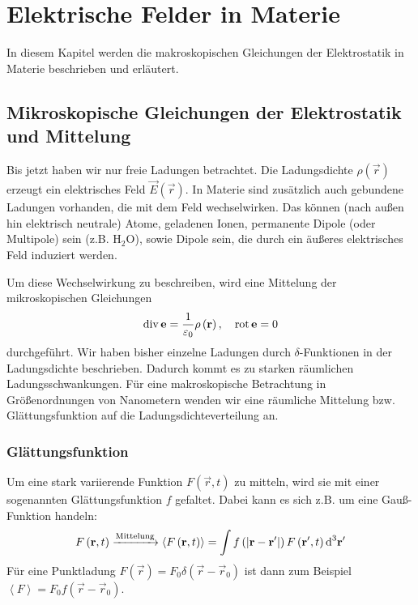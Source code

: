 

\chapter{Elektrische Felder in Materie}

In diesem Kapitel werden die makroskopischen Gleichungen der Elektrostatik in Materie beschrieben und erläutert.

\section{Mikroskopische Gleichungen der Elektrostatik und Mittelung\label{sec:mikroskopische_gleichungen_der_elektrostatik}}

Bis jetzt haben wir nur freie Ladungen betrachtet. Die Ladungsdichte $\rho \left(\vec {r}\right)$ erzeugt ein elektrisches Feld $\vec {E}(\vec r)$. In Materie sind zusätzlich auch gebundene Ladungen vorhanden, die mit dem Feld wechselwirken. Das können (nach außen hin elektrisch neutrale) Atome, geladenen Ionen, permanente Dipole (oder Multipole) sein (z.B. $\mathrm{H}_{2}\mathrm{O}$), sowie Dipole sein, die durch ein äußeres elektrisches Feld induziert werden.

Um diese Wechselwirkung zu beschreiben, wird eine Mittelung der mikroskopischen Gleichungen
\begin{equation*}
	\operatorname{div} \mathbf{e}=\frac{1}{\varepsilon _{0}}\rho \left(\mathbf{r}\right),\quad \operatorname{rot} \mathbf{e}=0
\end{equation*}
durchgeführt. Wir haben bisher einzelne Ladungen durch $\delta $-Funktionen in der Ladungsdichte beschrieben. Dadurch kommt es zu starken räumlichen Ladungsschwankungen. Für eine makroskopische Betrachtung in Größenordnungen von Nanometern wenden wir eine räumliche Mittelung bzw. Glättungsfunktion auf die Ladungsdichteverteilung an.


\subsection{Glättungsfunktion}

Um eine stark variierende Funktion $F\left(\vec {r},t\right)$ zu mitteln, wird sie mit einer sogenannten Glättungsfunktion $f$ gefaltet. Dabei kann es sich z.B. um eine Gauß-Funktion handeln:
\begin{equation*}
	F\left(\mathbf{r},t\right) \xrightarrow{\text{Mittelung}} \left\langle F\left(\mathbf{r},t\right)\right\rangle =\int f\left(\left| \mathbf{r}-\mathbf{r}'\right| \right)F\left(\mathbf{r}',t\right)\text{d} ^{3}\mathbf{r}'
\end{equation*}
Für eine Punktladung $F\left(\vec {r}\right)=F_{0}\delta \left(\vec {r}-\vec {r}_{0}\right)$ ist dann zum Beispiel $\left\langle F\right\rangle =F_{0}f\left(\vec {r}-\vec {r}_{0}\right)$.

